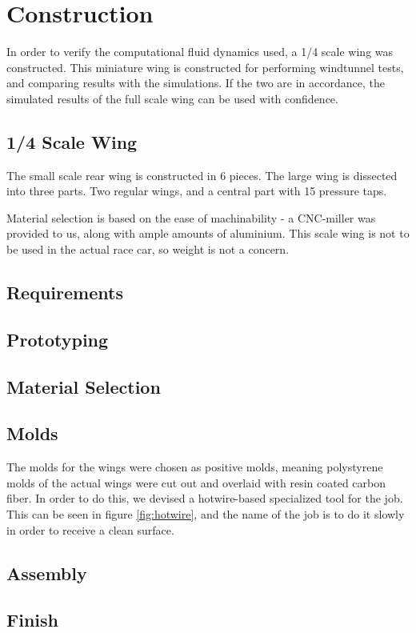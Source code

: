 \chapter{Construction}

In order to verify the computational fluid dynamics used, a 1/4 scale wing was constructed. This miniature wing is constructed for performing windtunnel tests, and comparing results with the simulations. If the two are in accordance, the simulated results of the full scale wing can be used with confidence.

\section{1/4 Scale Wing}

The small scale rear wing is constructed in 6 pieces. The large wing is dissected into three parts. Two regular wings, and a central part with 15 pressure taps.

Material selection is based on the ease of machinability - a CNC-miller was provided to us, along with ample amounts of aluminium. This scale wing is not to be used in the actual race car, so weight is not a concern.

\section{Requirements}




\section{Prototyping}

\section{Material Selection}

\section{Molds}

The molds for the wings were chosen as positive molds, meaning polystyrene molds of the actual wings were cut out and overlaid with resin coated carbon fiber. In order to do this, we devised a hotwire-based specialized tool for the job. This can be seen in figure \ref{fig:hotwire}, and the name of the job is to do it slowly in order to receive a clean surface.

\section{Assembly}

\section{Finish}

